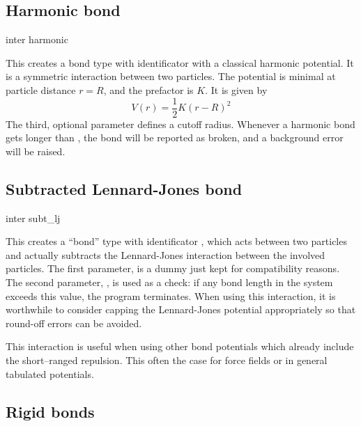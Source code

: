 \subsection{Harmonic bond}

\begin{essyntax}
  inter 
  harmonic   
\end{essyntax}
This creates a bond type with identificator  with a
classical harmonic potential. It is a symmetric interaction between two
particles. The potential is minimal at particle distance $r=R$, and the
prefactor is $K$. It is given by
\begin{equation}
  V(r) = \frac{1}{2} K \left( r - R \right)^2
\end{equation}
The third, optional parameter  defines a cutoff
radius.  Whenever a harmonic bond gets longer than
, the bond will be reported as broken, and a
background error will be raised.

\subsection{Subtracted Lennard-Jones bond}

\begin{essyntax}
  inter 
  subt_lj
   
\end{essyntax}
This creates a ``bond'' type with identificator , which
acts between two particles and actually subtracts the Lennard-Jones interaction
between the involved particles.  The first parameter,  is a dummy
just kept for compatibility reasons. The second parameter, , is used as a
check: if any bond length in the system exceeds this value, the program
terminates. When using this interaction, it is worthwhile to consider
capping the Lennard-Jones potential appropriately so that round-off errors can
be avoided.

This interaction is useful when using other bond potentials which already
include the short--ranged repulsion. This often the case for force fields or in
general tabulated potentials.

\subsection{Rigid bonds}
\label{sec:rattle}

